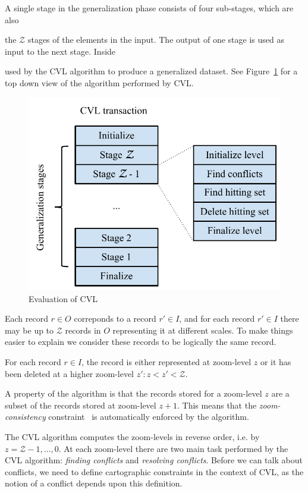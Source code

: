 A single stage in the generalization phase consists of four sub-stages, which are also 

 the $\mathcal{Z}$ stages   of the elements in the input. The output of one stage is used as input to the next stage. Inside 


used by the CVL algorithm to produce a generalized dataset. See Figure~\ref{fig:evaluation} for a top down view of the algorithm performed by CVL.

\begin{figure}[htbp]
\begin{center}
\includegraphics[scale=.75]{figs/cvl_stages.pdf}
\caption{Evaluation of CVL}
\label{fig:evaluation}
\end{center}
\end{figure}

Each record $r \in O$ correponds to a record $r' \in I$, and for each record $r' \in I$ there may be up to $\mathcal{Z}$ records in $O$ representing it at different scales. To make things easier to explain we consider these records to be logically the same record.

For each record $r \in I$, the record is either represented at zoom-level $z$ or it has been deleted at a higher zoom-level $z': z < z' < \mathcal{Z}$.

A property of the algorithm is that the records stored for a zoom-level $z$ are a subset of the records stored at zoom-level $z+1$. This means that the \emph{zoom-consistency} constraint~\cite{fusiontables} is automatically enforced by the algorithm.

The CVL algorithm computes the zoom-levels in reverse order, i.e. by $z = \mathcal{Z}-1, \dots, 0$. At each zoom-level there are two main task performed by the CVL algorithm: \emph{finding conflicts} and \emph{resolving conflicts}. Before we can talk about conflicts, we need to define cartographic constraints in the context of CVL, as the notion of a conflict depends upon this definition.

